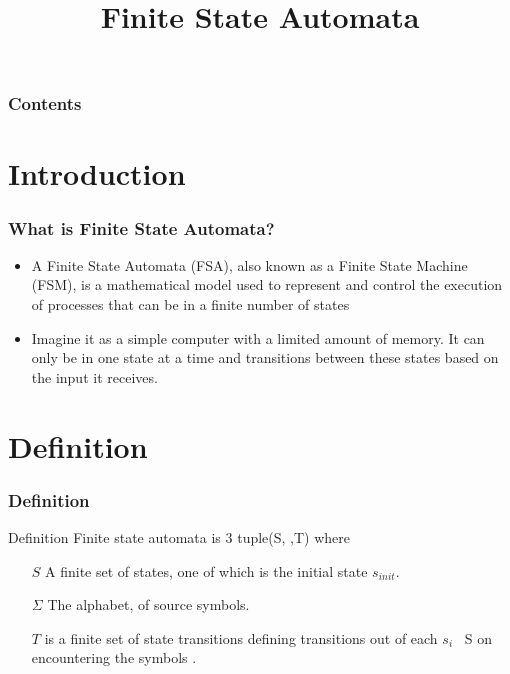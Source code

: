 \documentclass{beamer}
\title{Finite State Automata}
\author{}
\date{}
\begin{document}
\begin{frame}
    \titlepage
\end{frame}

\begin{frame}
    \frametitle{Contents}
    \tableofcontents[currentsection]
\end{frame}

\section{Introduction}
\begin{frame}
    \frametitle{What is Finite State Automata?}
    \begin{itemize}
        \item A Finite State Automata (FSA), also known as a Finite State Machine (FSM), is a mathematical model used to represent and control the execution of processes that can be in a finite number of states
        \item Imagine it as a simple computer with a limited amount of memory. It can only be in one state at a time and transitions between these states based on the input it receives.
        \end{itemize}
\end{frame}

\section{Definition}
\begin{frame}
    \frametitle{Definition}
    \begin{block}{Definition}
        Finite state automata is 3 tuple(S, \Sigma,T) where 
        
        \begin{itemize}
            \item[\( S \)] A finite set of states, one of which is the initial state $s_{init}$.
            \item[\( \Sigma \)] The alphabet, of source symbols.
            \item[\( T \)] is a finite set of state transitions defining transitions out of each $s_i $ \epsilon \ S on encountering the symbols \Sigma.
        \end{itemize}

    \end{block}
    
\end{frame}
\end{document}
